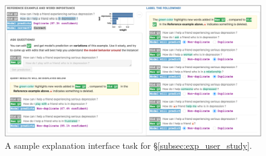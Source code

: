\begin{figure}[ht]
\centering
\includegraphics[width=1\textwidth]{figures/explanation_task_ui}
\vspace{-15pt}
\caption{A sample explanation interface task for \S\ref{subsec:exp_user_study}.}
\vspace{-10pt}
\label{fig:explanation_ui}
\end{figure}


